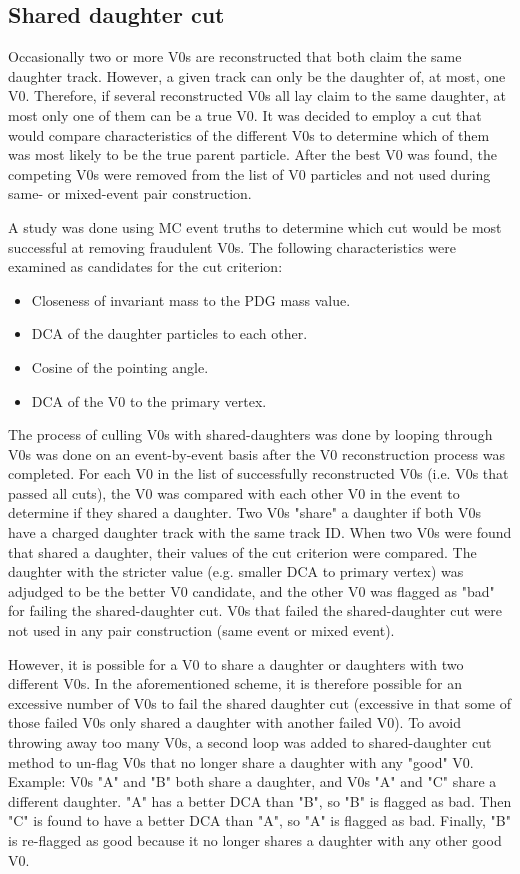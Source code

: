 \subsection{Shared daughter cut}

Occasionally two or more V0s are reconstructed that both claim the same daughter track.  However, a given track can only be the daughter of, at most, one V0.  Therefore, if several reconstructed V0s all lay claim to the same daughter, at most only one of them can be a true V0.  It was decided to employ a cut that would compare characteristics of the different V0s to determine which of them was most likely to be the true parent particle.  After the best V0 was found, the competing V0s were removed from the list of V0 particles and not used during same- or mixed-event pair construction.

A study was done using MC event truths to determine which cut would be most successful at removing fraudulent V0s.  The following characteristics were examined as candidates for the cut criterion:

\begin{itemize}
\item Closeness of invariant mass to the PDG mass value.
\item DCA of the daughter particles to each other.
\item Cosine of the pointing angle.
\item DCA of the V0 to the primary vertex.
\end{itemize}

The process of culling V0s with shared-daughters was done by looping through V0s was done on an event-by-event basis after the V0 reconstruction process was completed.  For each V0 in the list of successfully reconstructed V0s (i.e. V0s that passed all cuts), the V0 was compared with each other V0 in the event to determine if they shared a daughter.  Two V0s "share" a daughter if both V0s have a charged daughter track with the same track ID.  When two V0s were found that shared a daughter, their values of the cut criterion were compared.  The daughter with the stricter value (e.g. smaller DCA to primary vertex) was adjudged to be the better V0 candidate, and the other V0 was flagged as "bad" for failing the shared-daughter cut.  V0s that failed the shared-daughter cut were not used in any pair construction (same event or mixed event).

However, it is possible for a V0 to share a daughter or daughters with two different V0s. In the aforementioned scheme, it is therefore possible for an excessive number of V0s to fail the shared daughter cut (excessive in that some of those failed V0s only shared a daughter with another failed V0).  To avoid throwing away too many V0s, a second loop was added to shared-daughter cut method to un-flag V0s that no longer share a daughter with any "good" V0. Example: V0s "A" and "B" both share a daughter, and V0s "A" and "C" share a different daughter.  "A" has a better DCA than "B", so "B" is flagged as bad.  Then "C" is found to have a better DCA than "A", so "A" is flagged as bad.  Finally, "B" is re-flagged as good because it no longer shares a daughter with any other good V0.

